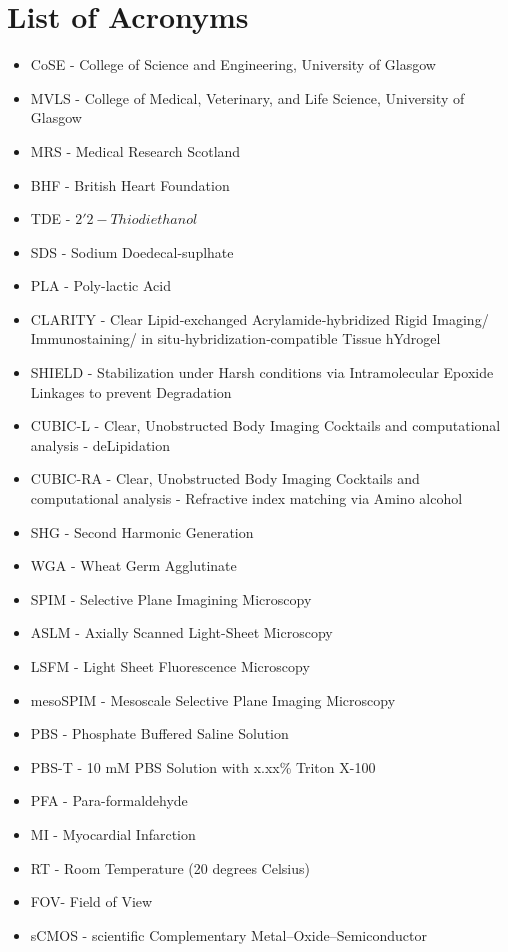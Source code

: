 \chapter{List of Acronyms}

\begin{itemize}
  \item CoSE - College of Science and Engineering, University of Glasgow
  \item MVLS - College of Medical, Veterinary, and Life Science, University of Glasgow
  \item MRS - Medical Research Scotland
  \item BHF - British Heart Foundation
  \item TDE - $2'2-Thiodiethanol$
  \item SDS - Sodium Doedecal-suplhate
  \item PLA - Poly-lactic Acid
  \item CLARITY - Clear Lipid‐exchanged Acrylamide‐hybridized Rigid Imaging/ Immunostaining/ in situ‐hybridization‐compatible Tissue hYdrogel
  \item SHIELD - Stabilization under Harsh conditions via Intramolecular Epoxide Linkages to prevent Degradation
  \item CUBIC-L - Clear, Unobstructed Body Imaging Cocktails and computational analysis - deLipidation
  \item CUBIC-RA - Clear, Unobstructed Body Imaging Cocktails and computational analysis - Refractive index matching via Amino alcohol
  \item SHG - Second Harmonic Generation
  \item WGA - Wheat Germ Agglutinate
  \item SPIM - Selective Plane Imagining Microscopy
  \item ASLM - Axially Scanned Light-Sheet Microscopy
  \item LSFM - Light Sheet Fluorescence Microscopy
  \item mesoSPIM - Mesoscale Selective Plane Imaging Microscopy
  \item PBS - Phosphate Buffered Saline Solution
  \item PBS-T - 10 mM PBS Solution with x.xx\% Triton X-100
  \item PFA - Para-formaldehyde
  \item MI - Myocardial Infarction 
  \item RT - Room Temperature (20 degrees Celsius)
  \item FOV- Field of View
  \item sCMOS - scientific Complementary Metal–Oxide–Semiconductor

\end{itemize}
